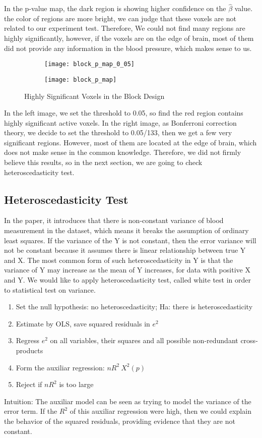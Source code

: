 In the p-value map, the dark region is showing higher confidence on the 
$\hat{\beta}$ value. the color of regions are more bright, we can judge that 
these voxels are not related to our experiment test. Therefore, We could not 
find many regions are highly significantly, however, if the voxels are on the 
edge of brain, most of them did not provide any information in the blood 
pressure, which makes sense to us.

\begin{figure}[!h]
\centering
\begin{subfigure}{.46\textwidth}
  \texttt{[image: block\_p\_map\_0\_05]}
  \centering
\end{subfigure}%
\begin{subfigure}{.44\textwidth}
  \texttt{[image: block\_p\_map]}
  \centering
\end{subfigure}
\caption{Highly Significant Voxels in the Block Design\label{fig:hsVoxels}}
\end{figure}

In the left image, we set the threshold to 0.05, so find the red region contains
highly significant active voxels. In the right image, as Bonferroni correction
theory, we decide to set the threshold to 0.05/133, then we get a few very 
significant regions. However, most of them are located at the edge of brain, 
which does not make sense in the common knowledge. Therefore, we did not firmly
believe this results, so in the next section, we are going to check heteroscedasticity
test.

\subsection{Heteroscedasticity Test}
In the paper, it introduces that there is non-constant variance of blood 
measurement in the dataset, which means it breaks the assumption of ordinary 
least squares. If the variance of the Y is not constant, then the error variance
will not be constant because it assumes there is linear relationship between 
true Y and X. The most common form of such heteroscedasticity in Y is that the 
variance of Y may increase as the mean of Y increases, for data with positive X
and Y. We would like to apply heteroscedasticity test, called white test in order to 
statistical test on variance.

\begin{enumerate}
\item Set the null hypothesis: no heteroscedasticity; Ha: there is heteroscedasticity
\item Estimate by OLS, save squared residuals in $e^2$
\item Regress $e^2$ on all variables, their squares and all possible non-redundant cross-products
\item Form the auxiliar regression: $n R^2 ~ X^2(p)$
\item Reject if $n R^2$ is too large
\end{enumerate}
Intuition: The auxiliar model can be seen as trying to model the variance of 
the error term. If the $R^2$ of this auxiliar regression were high, then we could
explain the behavior of the squared residuals, providing evidence that they are
not constant.

